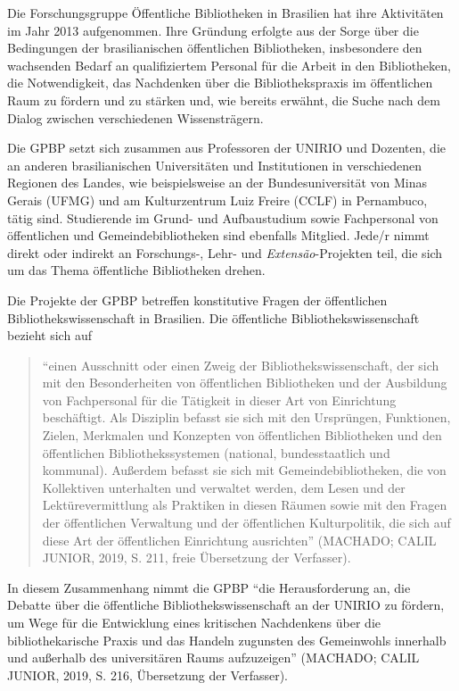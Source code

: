 \documentclass[a4paper,
fontsize=11pt,
oneside,
numbers=noperiodatend,
parskip=half-,
bibliography=totoc,
final
]{scrartcl}
\begin{document}
Die Forschungsgruppe Öffentliche Bibliotheken in Brasilien hat ihre
Aktivitäten im Jahr 2013 aufgenommen. Ihre Gründung erfolgte aus der
Sorge über die Bedingungen der brasilianischen öffentlichen
Bibliotheken, insbesondere den wachsenden Bedarf an qualifiziertem
Personal für die Arbeit in den Bibliotheken, die Notwendigkeit, das
Nachdenken über die Bibliothekspraxis im öffentlichen Raum zu fördern
und zu stärken und, wie bereits erwähnt, die Suche nach dem Dialog
zwischen verschiedenen Wissensträgern.

Die GPBP setzt sich zusammen aus Professoren der UNIRIO und Dozenten,
die an anderen brasilianischen Universitäten und Institutionen in
verschiedenen Regionen des Landes, wie beispielsweise an der
Bundesuniversität von Minas Gerais (UFMG) und am Kulturzentrum Luiz
Freire (CCLF) in Pernambuco, tätig sind. Studierende im Grund- und
Aufbaustudium sowie Fachpersonal von öffentlichen und
Gemeindebibliotheken sind ebenfalls Mitglied. Jede/r nimmt direkt oder
indirekt an Forschungs-, Lehr- und \emph{Extensão}-Projekten teil, die
sich um das Thema öffentliche Bibliotheken drehen.

Die Projekte der GPBP betreffen konstitutive Fragen der öffentlichen
Bibliothekswissenschaft in Brasilien. Die öffentliche
Bibliothekswissenschaft bezieht sich auf

\begin{quote}
\enquote{einen Ausschnitt oder einen Zweig der Bibliothekswissenschaft,
der sich mit den Besonderheiten von öffentlichen Bibliotheken und der
Ausbildung von Fachpersonal für die Tätigkeit in dieser Art von
Einrichtung beschäftigt. Als Disziplin befasst sie sich mit den
Ursprüngen, Funktionen, Zielen, Merkmalen und Konzepten von öffentlichen
Bibliotheken und den öffentlichen Bibliothekssystemen (national,
bundesstaatlich und kommunal). Außerdem befasst sie sich mit
Gemeindebibliotheken, die von Kollektiven unterhalten und verwaltet
werden, dem Lesen und der Lektürevermittlung als Praktiken in diesen
Räumen sowie mit den Fragen der öffentlichen Verwaltung und der
öffentlichen Kulturpolitik, die sich auf diese Art der öffentlichen
Einrichtung ausrichten} (MACHADO; CALIL JUNIOR, 2019, S. 211, freie
Übersetzung der Verfasser).
\end{quote}

In diesem Zusammenhang nimmt die GPBP \enquote{die Herausforderung an,
die Debatte über die öffentliche Bibliothekswissenschaft an der UNIRIO
zu fördern, um Wege für die Entwicklung eines kritischen Nachdenkens
über die bibliothekarische Praxis und das Handeln zugunsten des
Gemeinwohls innerhalb und außerhalb des universitären Raums aufzuzeigen}
(MACHADO; CALIL JUNIOR, 2019, S. 216, Übersetzung der Verfasser).
\end{document}
